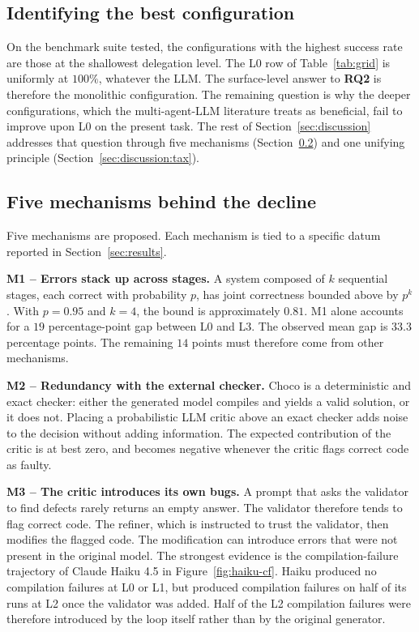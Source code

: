 \documentclass[11pt,a4paper]{article}
\newcommand{\rqtwo}{\textbf{RQ2}}
\begin{document}
\subsection{Identifying the best configuration}\label{sec:discussion:best}
On the benchmark suite tested, the configurations with the highest success rate are those at the shallowest delegation level. The L0 row of Table~\ref{tab:grid} is uniformly at $100\%$, whatever the LLM. The surface-level answer to \rqtwo{} is therefore the monolithic configuration. The remaining question is why the deeper configurations, which the multi-agent-LLM literature treats as beneficial, fail to improve upon L0 on the present task. The rest of Section~\ref{sec:discussion} addresses that question through five mechanisms (Section~\ref{sec:discussion:mechanisms}) and one unifying principle (Section~\ref{sec:discussion:tax}).

\subsection{Five mechanisms behind the decline}\label{sec:discussion:mechanisms}
Five mechanisms are proposed. Each mechanism is tied to a specific datum reported in Section~\ref{sec:results}.

\textbf{M1 -- Errors stack up across stages.} A system composed of $k$ sequential stages, each correct with probability $p$, has joint correctness bounded above by $p^k$. With $p = 0.95$ and $k = 4$, the bound is approximately $0.81$. M1 alone accounts for a $19$ percentage-point gap between L0 and L3. The observed mean gap is $33.3$ percentage points. The remaining $14$ points must therefore come from other mechanisms.

\textbf{M2 -- Redundancy with the external checker.} Choco is a deterministic and exact checker: either the generated model compiles and yields a valid solution, or it does not. Placing a probabilistic LLM critic above an exact checker adds noise to the decision without adding information. The expected contribution of the critic is at best zero, and becomes negative whenever the critic flags correct code as faulty.

\textbf{M3 -- The critic introduces its own bugs.} A prompt that asks the validator to find defects rarely returns an empty answer. The validator therefore tends to flag correct code. The refiner, which is instructed to trust the validator, then modifies the flagged code. The modification can introduce errors that were not present in the original model. The strongest evidence is the compilation-failure trajectory of Claude Haiku 4.5 in Figure~\ref{fig:haiku-cf}. Haiku produced no compilation failures at L0 or L1, but produced compilation failures on half of its runs at L2 once the validator was added. Half of the L2 compilation failures were therefore introduced by the loop itself rather than by the original generator.
\end{document}
